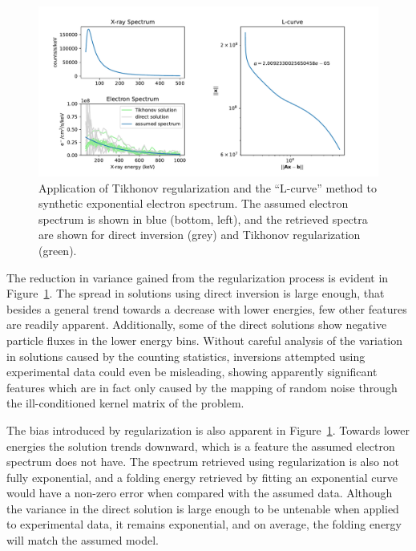 \begin{figure}[h]
    \centering
    \includegraphics[width=1.1\textwidth]{figures/chapter_4/l-curve-example/fig.pdf}
    \caption{Application of Tikhonov regularization and the ``L-curve'' method to synthetic exponential electron spectrum. The assumed electron spectrum is shown in blue (bottom, left), and the retrieved spectra are shown for direct inversion (grey) and Tikhonov regularization (green).  }
    \label{l-curve-example}
\end{figure}

The reduction in variance gained from the regularization process is evident in Figure~\ref{l-curve-example}. The spread in solutions using direct inversion is large enough, that besides a general trend towards a decrease with lower energies, few other features are readily apparent. Additionally, some of the direct solutions show negative particle fluxes in the lower energy bins. Without careful analysis of the variation in solutions caused by the counting statistics, inversions attempted using experimental data could even be misleading, showing apparently significant features which are in fact only caused by the mapping of random noise through the ill-conditioned kernel matrix of the problem. 

The bias introduced by regularization is also apparent in Figure~\ref{l-curve-example}. Towards lower energies the solution trends downward, which is a feature the assumed electron spectrum does not have. The spectrum retrieved using regularization is also not fully exponential, and a folding energy retrieved by fitting an exponential curve would have a non-zero error when compared with the assumed data. Although the variance in the direct solution is large enough to be untenable when applied to experimental data, it remains exponential, and on average, the folding energy will match the assumed model. 

